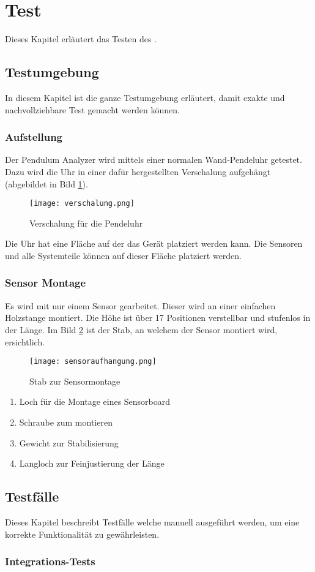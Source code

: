 \section{Test}
Dieses Kapitel erläutert das Testen des \documenttitle.
	\subsection{Testumgebung}
    In diesem Kapitel ist die ganze Testumgebung erläutert, damit exakte und nachvollziehbare Test gemacht werden können.
    \subsubsection{Aufstellung}
    Der Pendulum Analyzer wird mittels einer normalen Wand-Pendeluhr getestet. Dazu wird die Uhr in einer dafür hergestellten Verschalung aufgehängt (abgebildet in Bild \ref{fig:verschalung}).
    \begin{figure}[H]
        \centering
        \texttt{[image: verschalung.png]}
        \caption{Verschalung für die Pendeluhr}
        \label{fig:verschalung}
    \end{figure}

    \noindent Die Uhr hat eine Fläche auf der das Gerät platziert werden kann.
    Die Sensoren und alle Systemteile können auf dieser Fläche platziert werden.
    
    \clearpage
    \subsubsection{Sensor Montage}
    Es wird mit nur einem Sensor gearbeitet.
    Dieser wird an einer einfachen Holzstange montiert.
    Die Höhe ist über 17 Positionen verstellbar und stufenlos in der Länge. Im Bild \ref{fig:sensor_montage} ist der Stab, an welchem der Sensor montiert wird, ersichtlich.
    \begin{figure}[H]
        \centering
        \texttt{[image: sensoraufhangung.png]}
        \caption{Stab zur Sensormontage}
        \label{fig:sensor_montage}
    \end{figure}
    \begin{enumerate}
        \item Loch für die Montage eines Sensorboard
        \item Schraube zum montieren
        \item Gewicht zur Stabilisierung
        \item Langloch zur Feinjustierung der Länge
    \end{enumerate}

    \clearpage
    \subsection{Testfälle}
    Dieses Kapitel beschreibt Testfälle welche manuell ausgeführt werden, um eine korrekte Funktionalität zu gewährleisten.
    	\subsubsection{Integrations-Tests}
            

        \clearpage

